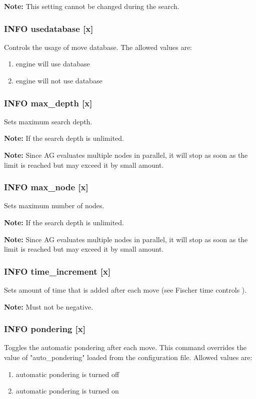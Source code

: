 \documentclass[12pt,a4paper]{article}
\begin{document}
\textbf{Note:} This setting cannot be changed during the search.

\subsubsection{INFO usedatabase [x]}
Controls the usage of move database. The allowed values are:
\begin{enumerate}[leftmargin=7.5em]
	\item[\text{$[x]=0$}]{engine will use database}
	\item[\text{$[x]=1$}]{engine will not use database}
\end{enumerate}

\subsubsection{INFO max{\_}depth [x]}
Sets maximum search depth. 

\textbf{Note:} If  the search depth is unlimited.

\textbf{Note:} Since AG evaluates multiple nodes in parallel, it will stop as soon as the limit is reached but may exceed it by small amount.

\subsubsection{INFO max{\_}node [x]}
Sets maximum number of nodes.

\textbf{Note:} If  the search depth is unlimited.

\textbf{Note:} Since AG evaluates multiple nodes in parallel, it will stop as soon as the limit is reached but may exceed it by small amount.

\subsubsection{INFO time{\_}increment [x]}
Sets amount of time that is added after each move (see Fischer time controls \cite{fischer}).

\textbf{Note:} Must not be negative.

\subsubsection{INFO pondering [x]}
Toggles the automatic pondering after each move. This command overrides the value of "auto{\_}pondering" loaded from the configuration file. Allowed values are:
\begin{enumerate}[leftmargin=7.5em]
	\item[\text{$[x]=0$}]{automatic pondering is turned off}
	\item[\text{$[x]=1$}]{automatic pondering is turned on}
\end{enumerate}
\end{document}
